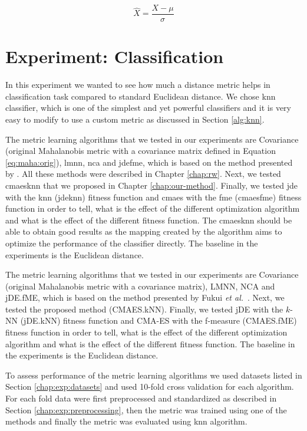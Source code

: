 \documentclass[12pt,a4paper]{report}
\begin{document}
\begin{equation} \label{eq:stand}
\hat{X} = \frac{X-\mu}{\sigma}
\end{equation}

\section{Experiment: Classification} \label{chap:exp:classification}

In this experiment we wanted to see how much a distance metric helps in classification task compared to standard Euclidean distance. We chose \ac{knn} classifier, which is one of the simplest and yet powerful classifiers and it is very easy to modify to use a custom metric as discussed in Section \ref{alg:knn}.

The metric learning algorithms that we tested in our experiments are Covariance (original Mahalanobis metric with a covariance matrix defined in Equation \ref{eq:maha:orig}), \ac{lmnn}, \ac{nca} and \ac{jdefme}, which is based on the method presented by \cite{fukui2013evolutionary}. All these methods were described in Chapter \ref{chap:rw}. Next, we tested \ac{cmaesknn} that we proposed in Chapter \ref{chap:our-method}. Finally, we tested \ac{jde} with the \ac{knn} (\ac{jdeknn}) fitness function and \ac{cmaes} with the \acl{fme} (\ac{cmaesfme}) fitness function in order to tell, what is the effect of the different optimization algorithm and what is the effect of the different fitness function. The \ac{cmaesknn} should be able to obtain good results as the mapping created by the algorithm aims to optimize the performance of the classifier directly. The baseline in the experiments is the Euclidean distance.

The metric learning algorithms that we tested in our experiments are Covariance (original Mahalanobis metric with a covariance matrix), LMNN, NCA and jDE.fME, which is based on the method presented by Fukui \emph{et al.}~\cite{fukui2013evolutionary}. Next, we tested the proposed method (CMAES.kNN). Finally, we tested jDE with the $k$-NN (jDE.kNN) fitness function and CMA-ES with the f-measure (CMAES.fME) fitness function in order to tell, what is the effect of the different optimization algorithm and what is the effect of the different fitness function. The baseline in the experiments is the Euclidean distance.

To assess performance of the metric learning algorithms we used datasets listed in Section \ref{chap:exp:datasets} and used 10-fold cross validation for each algorithm. For each fold data were first preprocessed and standardized as described in Section \ref{chap:exp:preprocessing}, then the metric was trained using one of the methods and finally the metric was evaluated using \ac{knn} algorithm.
\end{document}
